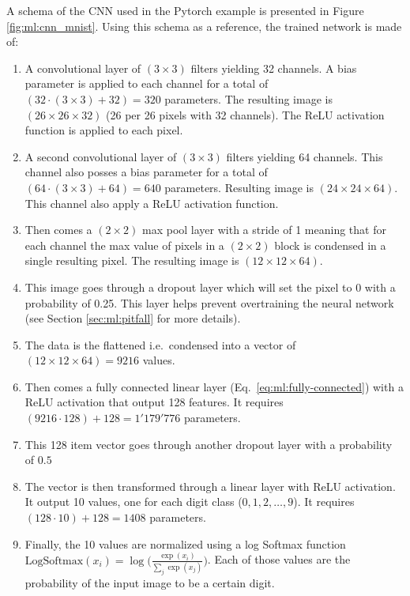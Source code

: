\documentclass[../main.tex]{subfiles}
\begin{document}
A schema of the CNN used in the Pytorch example is presented in Figure \ref{fig:ml:cnn_mnist}. Using this schema as a reference, the trained network is made of:
\begin{enumerate}
  \item A convolutional layer of $(3 \times 3)$ filters yielding 32 channels. A bias parameter is applied to each channel for a total of $(32 \cdot (3\times3) + 32) = 320$ parameters. The resulting image is $(26\times26 \times 32)$ (26 per 26 pixels with 32 channels). The ReLU activation function is applied to each pixel.
  \item A second convolutional layer of $(3 \times 3)$ filters yielding 64 channels. This channel also posses a bias parameter for a total of $(64 \cdot (3\times3) + 64) = 640$ parameters. Resulting image is $(24\times24\times64)$. This channel also apply a ReLU activation function.
  \item Then comes a $(2\times2)$ max pool layer with a stride of 1 meaning that for each channel the max value of pixels in a $(2\times2)$ block is condensed in a single resulting pixel. The resulting image is $(12 \times 12 \times 64)$.
  \item This image goes through a dropout layer which will set the pixel to 0 with a probability of 0.25. This layer helps prevent overtraining the neural network (see Section \ref{sec:ml:pitfall} for more details).
  \item The data is the flattened i.e.\ condensed into a vector of $(12 \times 12 \times 64) = 9216$ values.
  \item Then comes a fully connected linear layer (Eq.\ \ref{eq:ml:fully-connected}) with a ReLU activation that output 128 features. It requires $(9216 \cdot 128)+ 128 = 1'179'776$ parameters.
  \item This 128 item vector goes through another dropout layer with a probability of $0.5$
  \item The vector is then transformed through a linear layer with ReLU activation. It output 10 values, one for each digit class ($0, 1, 2, \dots, 9$). It requires $(128 \cdot 10) + 128 = 1408$ parameters.
  \item Finally, the 10 values are normalized using a log Softmax function $\mathrm{LogSoftmax}(x_i) = \log \bigg(\frac{\exp(x_i)}{\sum_j \exp(x_j)}\bigg)$. Each of those values are the probability of the input image to be a certain digit.
\end{enumerate}
\end{document}
